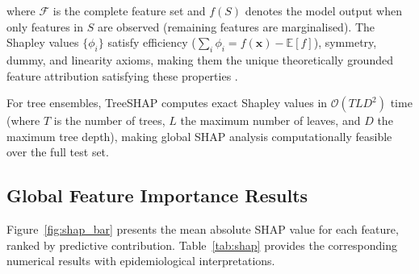 \documentclass[conference]{IEEEtran}
\begin{document}
where $\mathcal{F}$ is the complete feature set and $f(S)$ denotes
the model output when only features in $S$ are observed (remaining
features are marginalised). The Shapley values $\{\phi_i\}$ satisfy
efficiency ($\sum_i \phi_i = f(\mathbf{x}) - \mathbb{E}[f]$), symmetry,
dummy, and linearity axioms, making them the unique theoretically
grounded feature attribution satisfying these properties \cite{lundberg2017}.

For tree ensembles, TreeSHAP \cite{lundberg2020} computes exact
Shapley values in $\mathcal{O}(TLD^2)$ time (where $T$ is the number
of trees, $L$ the maximum number of leaves, and $D$ the maximum tree
depth), making global SHAP analysis computationally feasible over the
full test set.

\subsection{Global Feature Importance Results}

Figure~\ref{fig:shap_bar} presents the mean absolute SHAP value for
each feature, ranked by predictive contribution. Table~\ref{tab:shap}
provides the corresponding numerical results with epidemiological
interpretations.
\end{document}
